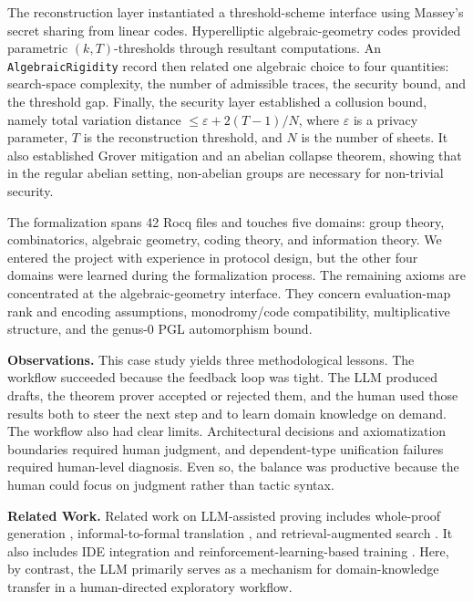 \documentclass[11pt,a4paper]{article}
\begin{document}
The reconstruction layer instantiated a threshold-scheme interface using Massey's secret sharing from linear codes. Hyperelliptic algebraic-geometry codes provided parametric $(k,T)$-thresholds through resultant computations. An \texttt{AlgebraicRigidity} record then related one algebraic choice to four quantities: search-space complexity, the number of admissible traces, the security bound, and the threshold gap. Finally, the security layer established a collusion bound, namely total variation distance $\leq \varepsilon + 2(T{-}1)/N$, where $\varepsilon$ is a privacy parameter, $T$ is the reconstruction threshold, and $N$ is the number of sheets. It also established Grover mitigation and an abelian collapse theorem, showing that in the regular abelian setting, non-abelian groups are necessary for non-trivial security.

The formalization spans 42 Rocq files and touches five domains: group theory, combinatorics, algebraic geometry, coding theory, and information theory. We entered the project with experience in protocol design, but the other four domains were learned during the formalization process. The remaining axioms are concentrated at the algebraic-geometry interface. They concern evaluation-map rank and encoding assumptions, monodromy/code compatibility, multiplicative structure, and the genus-0 PGL automorphism bound.

\noindent\textbf{Observations.}
This case study yields three methodological lessons. The workflow succeeded because the feedback loop was tight. The LLM produced drafts, the theorem prover accepted or rejected them, and the human used those results both to steer the next step and to learn domain knowledge on demand. The workflow also had clear limits. Architectural decisions and axiomatization boundaries required human judgment, and dependent-type unification failures required human-level diagnosis. Even so, the balance was productive because the human could focus on judgment rather than tactic syntax.

\noindent\textbf{Related Work.}
Related work on LLM-assisted proving includes whole-proof generation \cite{first2023baldur}, informal-to-formal translation \cite{jiang2023dsp}, and retrieval-augmented search \cite{yang2023leandojo}. It also includes IDE integration \cite{song2024leancopilot} and reinforcement-learning-based training \cite{alphaproof2024}. Here, by contrast, the LLM primarily serves as a mechanism for domain-knowledge transfer in a human-directed exploratory workflow.
\end{document}

